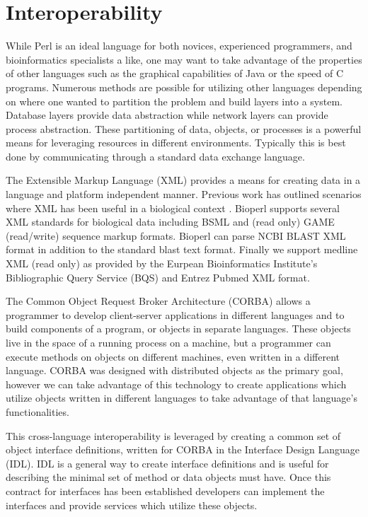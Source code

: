 \documentclass[12pt]{article}
\begin{document}
\section{Interoperability}


While Perl is an ideal language for both novices, experienced
programmers, and bioinformatics specialists a like, one may want to take
advantage of the properties of other languages such as the graphical
capabilities of Java or the speed of C programs.  Numerous methods are
possible for utilizing other languages depending on where one wanted
to partition the problem and build layers into a system.  Database
layers provide data abstraction while network layers can provide
process abstraction.  These partitioning of data, objects, or
processes is a powerful means for leveraging resources in different
environments.  Typically this is best done by communicating through
a standard data exchange language.  

The Extensible Markup Language (XML) provides a means for creating
data in a language and platform independent manner.  Previous work has
outlined scenarios where XML has been useful in a biological context
\cite{xml_bioinformatics}.  Bioperl supports several XML standards for
biological data including BSML and (read only) GAME (read/write)
sequence markup formats.  Bioperl can parse NCBI BLAST
XML format in addition to the standard blast text format.  Finally
we support medline XML (read only) as provided by the Eurpean
Bioinformatics Institute's Bibliographic Query Service (BQS) and
Entrez Pubmed XML format.

The Common Object Request Broker Architecture (CORBA) allows a
programmer to develop client-server applications in different
languages and to build components of a program, or objects in separate
languages.  These objects live in the space of a running process on a
machine, but a programmer can execute methods on objects on different
machines, even written in a different language.  CORBA was designed
with distributed objects as the primary goal, however we can take
advantage of this technology to create applications which utilize
objects written in different languages to take advantage of that
language's functionalities.

This cross-language interoperability is leveraged by creating a common
set of object interface definitions, written for CORBA in the
Interface Design Language (IDL).  IDL is a general way to create
interface definitions and is useful for describing the minimal set of
method or data objects must have.  Once this contract for interfaces
has been established developers can implement the interfaces and
provide services which utilize these objects. 
\end{document}
